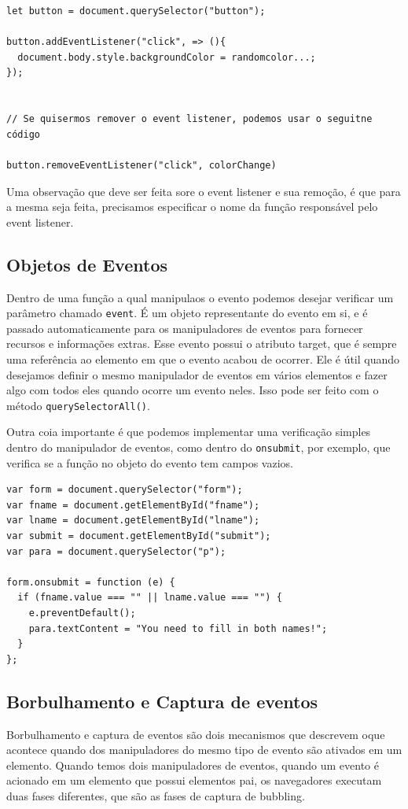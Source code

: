 \documentclass[12pt, a4paper]{paper}
\begin{document}
\begin{verbatim}
let button = document.querySelector("button");

button.addEventListener("click", => (){
  document.body.style.backgroundColor = randomcolor...;
});


// Se quisermos remover o event listener, podemos usar o seguitne código 

button.removeEventListener("click", colorChange)
\end{verbatim}

Uma observação que deve ser feita sore o event listener e sua remoção, é que para a 
mesma seja feita, precisamos especificar o nome da função responsável pelo event 
listener.

\subsection{Objetos de Eventos} %
\label{sub:Objetos de Eventos}
Dentro de uma função a qual manipulaos o evento podemos desejar verificar um parâmetro 
chamado \texttt{event}. É um objeto representante do evento em si, e é passado 
automaticamente para os manipuladores de eventos para fornecer recursos e informações 
extras.
Esse evento possui o atributo target, que é sempre uma referência ao elemento em que o 
evento acabou de ocorrer. Ele é útil quando desejamos definir o mesmo manipulador de 
eventos em vários elementos e fazer algo com todos eles quando ocorre um evento neles. 
Isso pode ser feito com o método \texttt{querySelectorAll()}.

Outra coia importante é que podemos implementar uma verificação simples dentro do 
manipulador de eventos, como dentro do \texttt{onsubmit}, por exemplo, que verifica 
se a função no objeto do evento tem campos vazios.

\begin{verbatim}
var form = document.querySelector("form");
var fname = document.getElementById("fname");
var lname = document.getElementById("lname");
var submit = document.getElementById("submit");
var para = document.querySelector("p");

form.onsubmit = function (e) {
  if (fname.value === "" || lname.value === "") {
    e.preventDefault();
    para.textContent = "You need to fill in both names!";
  }
};
\end{verbatim}

\subsection{Borbulhamento e Captura de eventos} %
\label{sub:Borbulhamento e Captura de eventos}
Borbulhamento e captura de eventos são dois mecanismos que descrevem oque acontece 
quando dos manipuladores do mesmo tipo de evento são ativados em um elemento. Quando 
temos dois manipuladores de eventos, quando um evento é acionado em um elemento que 
possui elementos pai, os navegadores executam duas fases diferentes, que são as fases 
de captura de bubbling. 
\end{document}

